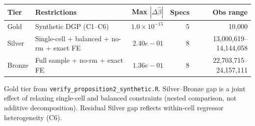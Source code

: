 \begin{table}[ht]
\centering
\footnotesize
\begin{tabular}{llrrr}
\toprule
Tier & Restrictions & Max $|\Delta\hat{\beta}|$ & Specs & Obs range \\
\midrule
Gold & Synthetic DGP (C1--C6) & $1.0 \times 10^{-15}$ & 5 & 10{,}000 \\
Silver & Single-cell + balanced + no-rm + exact FE & $2.40e-01$ & 8 & 13{,}000{,}619--14{,}144{,}058 \\
Bronze & Full sample + no-rm + exact FE & $1.36e-01$ & 8 & 22{,}703{,}715--24{,}157{,}111 \\
\bottomrule
\end{tabular}
\parbox{\linewidth}{\scriptsize Gold tier from \texttt{verify\_proposition2\_synthetic.R}. Silver--Bronze gap is a joint effect of relaxing single-cell and balanced constraints (nested comparison, not additive decomposition). Residual Silver gap reflects within-cell regressor heterogeneity (C6).}
\end{table}
